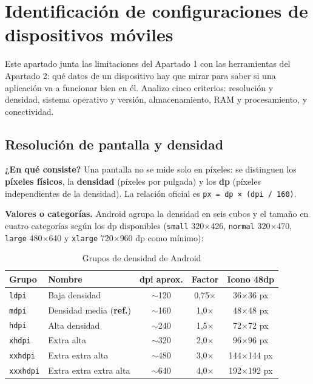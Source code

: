 \documentclass[11pt,a4paper]{article}
\newcommand{\code}[1]{\texttt{\color{navylight}#1}}
\newcommand{\campo}[1]{\textbf{\color{navy}#1}}
\begin{document}
	
	\section{Identificación de configuraciones de dispositivos móviles}

	Este apartado junta las limitaciones del Apartado 1 con las herramientas del Apartado 2: qué datos de un dispositivo hay que mirar para saber si una aplicación va a funcionar bien en él. Analizo cinco criterios: resolución y densidad, sistema operativo y versión, almacenamiento, RAM y procesamiento, y conectividad.

	\subsection{Resolución de pantalla y densidad}

	\campo{¿En qué consiste?}
	Una pantalla no se mide solo en píxeles: se distinguen los \textbf{píxeles físicos}, la \textbf{densidad} (píxeles por pulgada) y los \textbf{dp} (píxeles independientes de la densidad). La relación oficial es \code{px = dp × (dpi / 160)}.

	\campo{Valores o categorías.} Android agrupa la densidad en seis cubos y el tamaño en cuatro categorías según los dp disponibles (\code{small} 320$\times$426, \code{normal} 320$\times$470, \code{large} 480$\times$640 y \code{xlarge} 720$\times$960 dp como mínimo):

	\begin{table}[htbp]
		\centering
		\small
		\begin{tabular}{@{}l l c c c@{}}
			\toprule
			\rowcolor{primary}
			\textcolor{paper}{\sffamily\bfseries Grupo} & \textcolor{paper}{\sffamily\bfseries Nombre} & \textcolor{paper}{\sffamily\bfseries dpi aprox.} & \textcolor{paper}{\sffamily\bfseries Factor} & \textcolor{paper}{\sffamily\bfseries Icono 48dp} \\
			\midrule
			\code{ldpi} & Baja densidad & $\sim$120 & 0,75$\times$ & 36$\times$36 px \\
			\rowcolor{soft}
			\code{mdpi} & Densidad media (\textbf{ref.}) & $\sim$160 & 1,0$\times$ & 48$\times$48 px \\
			\code{hdpi} & Alta densidad & $\sim$240 & 1,5$\times$ & 72$\times$72 px \\
			\rowcolor{soft}
			\code{xhdpi} & Extra alta & $\sim$320 & 2,0$\times$ & 96$\times$96 px \\
			\code{xxhdpi} & Extra extra alta & $\sim$480 & 3,0$\times$ & 144$\times$144 px \\
			\rowcolor{soft}
			\code{xxxhdpi} & Extra extra extra alta & $\sim$640 & 4,0$\times$ & 192$\times$192 px \\
			\bottomrule
		\end{tabular}
		\caption{Grupos de densidad de Android}
	\end{table}
\end{document}
